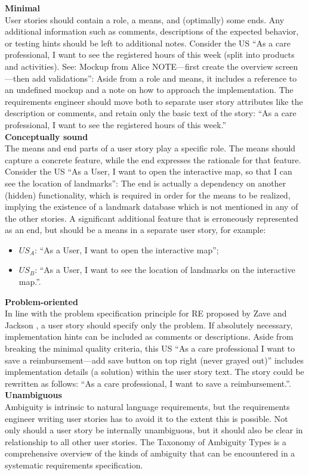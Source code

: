 \textbf{Minimal}\\ 
User stories should contain a role, a means, and (optimally) some ends. Any additional information such as comments, descriptions of the expected behavior, or testing hints should be left to additional notes. Consider the US \enquote{As a care professional, I want to see the registered hours of this week (split into products and activities). See: Mockup from Alice NOTE—ﬁrst create the overview screen—then add validations}: Aside from a role and means, it includes a reference to an undeﬁned mockup and a note on how to approach the implementation. The requirements engineer should move both to separate user story attributes like the description or comments, and retain only the basic text of the story: \enquote{As a care professional, I want to see the registered hours of this week.} \\ 
\textbf{Conceptually sound}\\ 
The means and end parts of a user story play a speciﬁc role. The means should capture a concrete feature, while the end expresses the rationale for that feature. Consider the US \enquote{As a User, I want to open the interactive map, so that I can see the location of landmarks}: The end is actually a dependency on another (hidden) functionality, which is required in order for the means to be realized, implying the existence of a landmark database which is not mentioned in any of the other stories. A signiﬁcant additional feature that is erroneously represented as an end, but should be a means in a separate user story, for example:
\begin{itemize}
\item $US_A$: \enquote{As a User, I want to open the interactive map};
\item $US_B$: \enquote{As a User, I want to see the location of landmarks on the interactive map.}.
\end{itemize}
\textbf{Problem-oriented}\\ 
In line with the problem speciﬁcation principle for RE proposed by Zave and Jackson \cite{zave1997four}, a user story should specify only the problem. If absolutely necessary, implementation hints can be included as comments or descriptions. Aside from breaking the minimal quality criteria, this US \enquote{As a care professional I want to save a reimbursement—add save button on top right (never grayed out)} includes implementation details (a solution) within the user story text. The story could be rewritten as follows: \enquote{As a care professional, I want to save a reimbursement.}. \\ 
\textbf{Unambiguous}\\ 
Ambiguity is intrinsic to natural language requirements, but the requirements engineer writing user stories has to avoid it to the extent this is possible. Not only should a user story be internally unambiguous, but it should also be clear in relationship to all other user stories. The Taxonomy of Ambiguity Types \cite{berry2004ambiguity} is a comprehensive overview of the kinds of ambiguity that can be encountered in a systematic requirements speciﬁcation.

